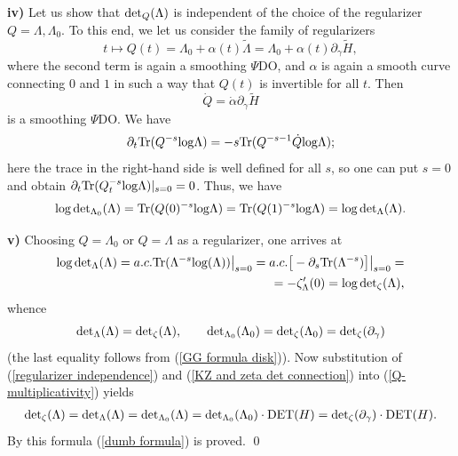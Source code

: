 \documentclass{amsart}
\begin{document}
{\bf iv)} Let us show that ${\rm det}_{Q}(\Lambda)$ is independent of the choice of the regularizer $Q=\Lambda,\Lambda_0$. To this end, we let us consider the family of regularizers 
$$t\mapsto Q(t)=\Lambda_0+\alpha(t)\tilde{\Lambda}=\Lambda_0+\alpha(t)\partial_\gamma\tilde{H},$$ 
where the second term is again a smoothing $\Psi$DO, and $\alpha$ is again a smooth curve connecting $0$ and $1$ in such a way that $Q(t)$ is invertible for all $t$. Then 
$$\dot{Q}=\dot{\alpha}\partial_\gamma\tilde{H}$$
is a smoothing $\Psi$DO. We have
$$\partial_t{\rm Tr}(Q^{-s}{\rm log}\Lambda)=-s{\rm Tr}(Q^{-s-1}\dot{Q}{\rm log}\Lambda);$$
here the trace in the right-hand side is well defined for all $s$, so one can put $s=0$ and obtain $\partial_t{\rm Tr}(Q_t^{-s}{\rm log}\Lambda)|_{s=0}=0$. Thus, we have 
\begin{align}
\label{regularizer independence}
{\rm log}\,{\rm det}_{\Lambda_0}(\Lambda)={\rm Tr}(Q(0)^{-s}{\rm log}\Lambda)={\rm Tr}(Q(1)^{-s}{\rm log}\Lambda)={\rm log}\,{\rm det}_{\Lambda}(\Lambda).
\end{align}

{\bf v)} Choosing $Q=\Lambda_0$ or $Q=\Lambda$ as a regularizer, one arrives at
\begin{align*}
{\rm log}\,{\rm det}_{\Lambda}(\Lambda)=a.c.{\rm Tr}(\Lambda^{-s}{\rm log}(\Lambda))\big|_{s=0}=a.c.\big[-\partial_s{\rm Tr}(\Lambda^{-s})\big]\big|_{s=0}=\\
=-\zeta'_{\Lambda}(0)={\rm log}\,{\rm det}_\zeta(\Lambda),
\end{align*}
whence
\begin{equation}
\label{KZ and zeta det connection}
{\rm det}_{\Lambda}(\Lambda)={\rm det}_\zeta(\Lambda), \qquad {\rm det}_{\Lambda_0}(\Lambda_0)={\rm det}_\zeta(\Lambda_0)={\rm det}_\zeta(\partial_\gamma)
\end{equation}
(the last equality follows from (\ref{GG formula disk})). Now substitution of (\ref{regularizer independence}) and (\ref{KZ and zeta det connection}) into (\ref{Q-multiplicativity}) yields
\begin{align*}
{\rm det}_\zeta(\Lambda)={\rm det}_{\Lambda}(\Lambda)={\rm det}_{\Lambda_0}(\Lambda)={\rm det}_{\Lambda_0}(\Lambda_0)\cdot{\rm DET}(H)={\rm det}_\zeta(\partial_\gamma)\cdot{\rm DET}(H).
\end{align*}
By this formula (\ref{dumb formula}) is proved. \qed
\end{document}
